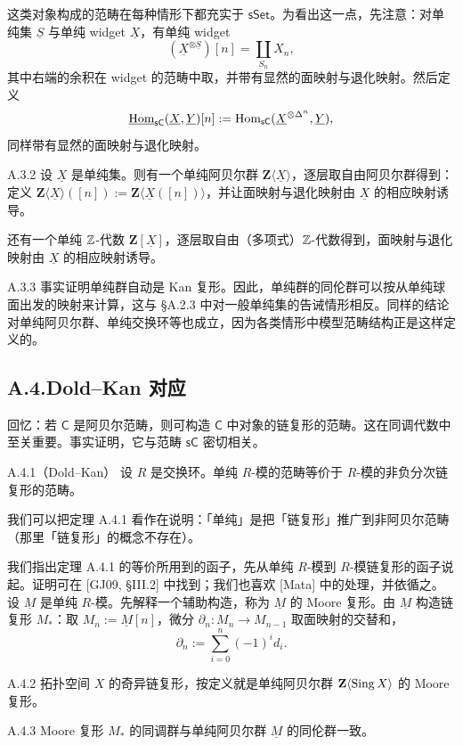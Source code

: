 这类对象构成的范畴在每种情形下都充实于 $\mathsf{sSet}$。为看出这一点，先注意：对单纯集 $\underline S$ 与单纯 widget $\underline X$，有单纯 widget
\[
(\underline X^{\otimes\underline S})[n]=\coprod_{S_n}X_n,
\]
其中右端的余积在 widget 的范畴中取，并带有显然的面映射与退化映射。然后定义
\[
\underline{\operatorname{Hom}}_{\mathsf{sC}}(\underline X,\underline Y)[n]:=\operatorname{Hom}_{\mathsf{sC}}(\underline X^{\otimes\Delta^n},\underline Y),
\]
同样带有显然的面映射与退化映射。

\begin{exam}{A.3.2}\label{thm:a6-06-19}
设 $\underline X$ 是单纯集。则有一个单纯阿贝尔群 $\mathbf Z\langle\underline X\rangle$，逐层取自由阿贝尔群得到：定义 $\mathbf Z\langle\underline X\rangle([n]):=\mathbf Z\langle\underline X([n])\rangle$，并让面映射与退化映射由 $\underline X$ 的相应映射诱导。

还有一个单纯 $\mathbb{Z}$-代数 $\mathbf Z[\underline X]$，逐层取自由（多项式）$\mathbb{Z}$-代数得到，面映射与退化映射由 $\underline X$ 的相应映射诱导。
\end{exam}

\begin{rem}{A.3.3}\label{thm:a6-06-20}
事实证明单纯群自动是 Kan 复形。因此，单纯群的同伦群可以按从单纯球面出发的映射来计算，这与 §A.2.3 中对一般单纯集的告诫情形相反。同样的结论对单纯阿贝尔群、单纯交换环等也成立，因为各类情形中模型范畴结构正是这样定义的。
\end{rem}

\subsection*{A.4.\quad Dold–Kan 对应}

回忆：若 $\mathsf C$ 是阿贝尔范畴，则可构造 $\mathsf C$ 中对象的链复形的范畴。这在同调代数中至关重要。事实证明，它与范畴 $\mathsf{sC}$ 密切相关。

\begin{thm}{A.4.1}（Dold–Kan）\label{thm:a6-06-21}
设 $R$ 是交换环。单纯 $R$-模的范畴等价于 $R$-模的非负分次链复形的范畴。
\end{thm}

我们可以把定理 A.4.1 看作在说明：「单纯」是把「链复形」推广到非阿贝尔范畴（那里「链复形」的概念不存在）。

我们指出定理 A.4.1 的等价所用到的函子，先从单纯 $R$-模到 $R$-模链复形的函子说起。证明可在 [GJ09, §III.2] 中找到；我们也喜欢 [Mata] 中的处理，并依循之。设 $\underline M$ 是单纯 $R$-模。先解释一个辅助构造，称为 $\underline M$ 的 Moore 复形。由 $\underline M$ 构造链复形 $M_*$：取 $M_n:=\underline M[n]$，微分 $\partial_n\colon M_n\to M_{n-1}$ 取面映射的交替和，
\[
\partial_n:=\sum_{i=0}^n(-1)^id_i.
\]

\begin{exam}{A.4.2}\label{thm:a6-06-22}
拓扑空间 $X$ 的奇异链复形，按定义就是单纯阿贝尔群 $\mathbf Z\langle\operatorname{Sing} X\rangle$ 的 Moore 复形。
\end{exam}

\begin{rem}{A.4.3}\label{thm:a6-06-23}
Moore 复形 $M_*$ 的同调群与单纯阿贝尔群 $\underline M$ 的同伦群一致。
\end{rem}
